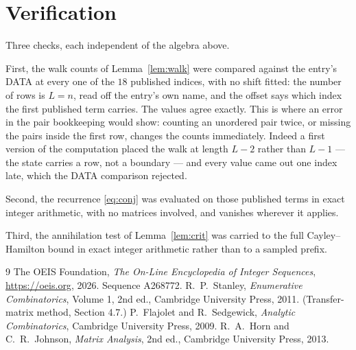 \documentclass[11pt,a4paper]{article}
\theoremstyle{plain}
\theoremstyle{definition}
\begin{document}
\section{Verification}

Three checks, each independent of the algebra above.

First, the walk counts of Lemma~\ref{lem:walk} were compared against the entry's DATA at
every one of the $18$ published indices, with no shift fitted: the number of rows is
$L=n$, read off the entry's own name, and the offset says which index the first
published term carries. The values agree exactly. This is where an error in the pair
bookkeeping would show: counting an unordered pair twice, or missing the pairs inside the
first row, changes the counts immediately. Indeed a first version of the computation
placed the walk at length $L-2$ rather than $L-1$ --- the state carries a row, not a
boundary --- and every value came out one index late, which the DATA comparison rejected.

Second, the recurrence \eqref{eq:conj} was evaluated on those published terms in exact
integer arithmetic, with no matrices involved, and vanishes wherever it applies.

Third, the annihilation test of Lemma~\ref{lem:crit} was carried to the full
Cayley--Hamilton bound in exact integer arithmetic rather than to a sampled prefix.

\begin{thebibliography}{9}
 The OEIS Foundation, \emph{The On-Line Encyclopedia of Integer
Sequences}, \url{https://oeis.org}, 2026. Sequence A268772.
 R.~P.~Stanley, \emph{Enumerative Combinatorics}, Volume 1, 2nd ed.,
Cambridge University Press, 2011. (Transfer-matrix method, Section 4.7.)
 P.~Flajolet and R.~Sedgewick, \emph{Analytic Combinatorics}, Cambridge
University Press, 2009.
 R.~A.~Horn and C.~R.~Johnson, \emph{Matrix Analysis}, 2nd ed., Cambridge
University Press, 2013.
\end{thebibliography}
\end{document}
